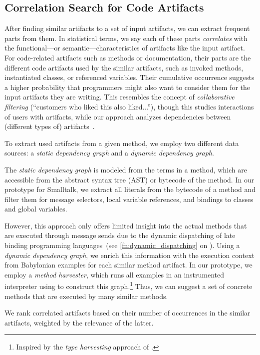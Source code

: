 \subsection*{Correlation Search for Code Artifacts}
\label{sec:suggestions/search/correlations}

After finding similar artifacts to a set of input artifacts, we can extract frequent parts from them.
In statistical terms, we say each of these parts \emph{correlates} with the functional---or semantic---characteristics of artifacts like the input artifact.
For code-related artifacts such as methods or documentation, their parts are the different code artifacts used by the similar artifacts, such as invoked methods, instantiated classes, or referenced variables.
Their cumulative occurrence suggests a higher probability that programmers might also want to consider them for the input artifacts they are writing.
This resembles the concept of \emph{collaborative filtering} (``customers who liked this also liked...''), though this studies interactions of users with artifacts, while our approach analyzes dependencies between (different types of) artifacts~\cite{su2009survey}.

To extract used artifacts from a given method, we employ two different data sources: a \emph{static dependency graph} and a \emph{dynamic dependency graph}.

The \emph{static dependency graph} is modeled from the terms in a method, which are accessible from the abstract syntax tree (AST) or bytecode of the method.
In our prototype for Smalltalk, we extract all literals from the bytecode of a method and filter them for message selectors, local variable references, and bindings to classes and global variables.

However, this approach only offers limited insight into the actual methods that are executed through message sends due to the dynamic dispatching of late binding programming languages~(see \cref{fn:dynamic_dispatching} on ).
Using a \emph{dynamic dependency graph}, we enrich this information with the execution context from Babylonian examples for each similar method artifact.
In our prototype, we employ a \emph{method harvester}, which runs all examples in an instrumented interpreter using \simstudio to construct this graph.\footnote{Inspired by the \emph{type harvesting} approach of \cite{haupt2011type}.}
Thus, we can suggest a set of concrete methods that are executed by many similar methods.

We rank correlated artifacts based on their number of occurrences in the similar artifacts, weighted by the relevance of the latter.

